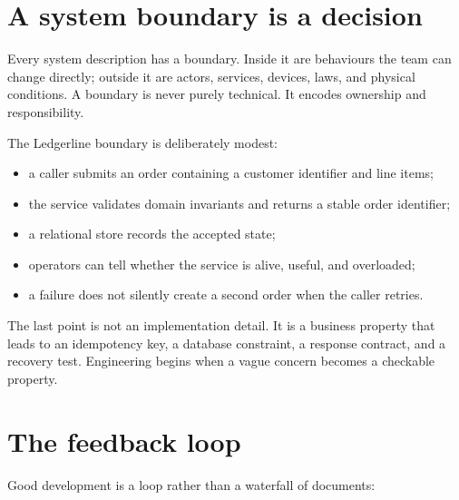 \section{A system boundary is a decision}
Every system description has a boundary. Inside it are behaviours the team can
change directly; outside it are actors, services, devices, laws, and physical
conditions. A boundary is never purely technical. It encodes ownership and
responsibility.

The Ledgerline boundary is deliberately modest:

\begin{itemize}
  \item a caller submits an order containing a customer identifier and line items;
  \item the service validates domain invariants and returns a stable order identifier;
  \item a relational store records the accepted state;
  \item operators can tell whether the service is alive, useful, and overloaded;
  \item a failure does not silently create a second order when the caller retries.
\end{itemize}

The last point is not an implementation detail. It is a business property that
leads to an idempotency key, a database constraint, a response contract, and a
recovery test. Engineering begins when a vague concern becomes a checkable
property.

\section{The feedback loop}
Good development is a loop rather than a waterfall of documents:

\begin{center}
\end{center}

